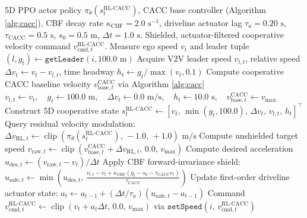 \begin{algorithm}[htbp]
\caption{Hybrid 5D PPO + CACC Longitudinal Control (RL-CACC) with CBF Safety Shield}
\label{alg:rl_cacc}
\begin{algorithmic}[1]
\Require 5D PPO actor policy $\pi_\theta(s_t^{\text{RL-CACC}})$, CACC base controller (Algorithm \ref{alg:cacc}), CBF decay rate $\kappa_{\text{CBF}} = 2.0\text{ s}^{-1}$, driveline actuator lag $\tau_a = 0.20\text{ s}$, $\tau_{\text{CACC}} = 0.5\text{ s}$, $s_0 = 0.5\text{ m}$, $\Delta t = 1.0\text{ s}$.
\Ensure Shielded, actuator-filtered cooperative velocity command $v_{\text{cmd},t}^{\text{RL-CACC}}$.
    \State Measure ego speed $v_t$ and leader tuple $(l, g_t) \gets \texttt{getLeader}(i, 100.0\text{ m})$
        \State Acquire V2V leader speed $v_{l,t}$, relative speed $\Delta v_t \gets v_t - v_{l,t}$, time headway $h_t \gets g_t / \max(v_t, 0.1)$
        \State Compute cooperative CACC baseline velocity $v_{\text{base},t}^{\text{CACC}}$ via Algorithm \ref{alg:cacc}
    \Else
        \State $v_{l,t} \gets v_t, \quad g_t \gets 100.0\text{ m}, \quad \Delta v_t \gets 0.0\text{ m/s}, \quad h_t \gets 10.0\text{ s}, \quad v_{\text{base},t}^{\text{CACC}} \gets v_{\max}$
    \EndIf
    \State Construct 5D cooperative state $s_t^{\text{RL-CACC}} \gets \left[v_t, \, \min(g_t, 100.0), \, \Delta v_t, \, v_{l,t}, \, h_t\right]^\top$
    \State Query residual velocity modulation: $\Delta v_{\text{RL},t} \gets \operatorname{clip}\left(\pi_\theta(s_t^{\text{RL-CACC}}), \, -1.0, \, +1.0\right)\text{ m/s}$
    \State Compute unshielded target speed $v_{\text{raw},t} \gets \operatorname{clip}\left(v_{\text{base},t}^{\text{CACC}} + \Delta v_{\text{RL},t}, \, 0.0, \, v_{\max}\right)$
    \State Compute desired acceleration $u_{\text{des},t} \gets (v_{\text{raw},t} - v_t) / \Delta t$
    \State Apply CBF forward-invariance shield: $u_{\text{safe},t} \gets \min\left(u_{\text{des},t}, \, \frac{v_{l,t} - v_t + \kappa_{\text{CBF}}(g_t - s_0 - \tau_{\text{CACC}} v_t)}{\tau_{\text{CACC}}}\right)$
    \State Update first-order driveline actuator state: $a_t \gets a_{t-1} + (\Delta t / \tau_a)(u_{\text{safe},t} - a_{t-1})$
    \State Command $v_{\text{cmd},t}^{\text{RL-CACC}} \gets \operatorname{clip}\left(v_t + a_t \Delta t, \, 0.0, \, v_{\max}\right)$ via $\texttt{setSpeed}(i, \, v_{\text{cmd},t}^{\text{RL-CACC}})$
\EndFor
\end{algorithmic}
\end{algorithm}
